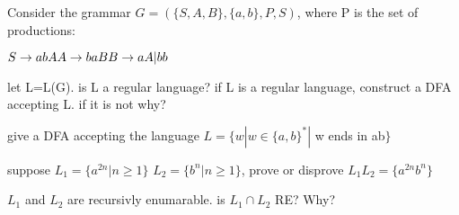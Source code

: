 \documentclass{exam}
\begin{document}
\begin{questions}
  \question
  Consider the grammar $G = (\{S,A,B\}, \{a,b\}, P, S)$, where P is the set of productions:
  \begin{center}
    $
    S \rightarrow abA\\
    A \rightarrow baB\\
    B \rightarrow aA|bb\\
    $
  \end{center}
  let L=L(G). is L a regular language? if L is a regular language, construct a DFA accepting L. if it is not why?

  \question
  give a DFA accepting the language $L = \{w|w \in \{a,b\}^* | $ w ends in ab$\}$

  \question
  suppose $L_1 = \{a^{2n}| n \ge 1\}$ $L_2 = \{b^{n}| n \ge 1\}$, prove or disprove $L_{1}L_{2} = \{a^{2n}b^n\}$

  \question
  $L_1$ and $L_2$ are recursivly enumarable. is $L_1 \cap L_2$ RE? Why?
\end{questions}
\end{document}
